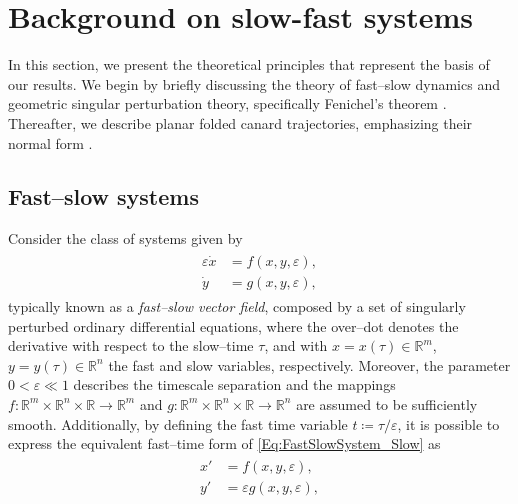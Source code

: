 \documentclass[3p]{elsarticle}
\theoremstyle{plain}
\theoremstyle{remark}
\theoremstyle{definition}
\begin{document}
\appendix
\renewcommand{\thetheorem}{\Alph{section}.\arabic{theorem}}
\renewcommand{\thedefinition}{\Alph{section}.\arabic{definition}}
\renewcommand{\theremark}{\Alph{section}.\arabic{remark}}
\section{Background on slow-fast systems}\label{Sec:Preliminaries}
    In this section, we present the theoretical principles that represent the basis of our results. We begin by briefly discussing the theory of fast--slow dynamics and geometric singular perturbation theory, specifically Fenichel's theorem \cite{Ref:Fenichel1979, Ref:Kuehn2015}. Thereafter, we describe planar folded canard trajectories, emphasizing their normal form \cite{Ref:Krupa2001, Ref:JardonKojakhmetov2022}.
\subsection{Fast--slow systems}
    \label{Sec:FastSlowSystems}
        Consider the class of systems given by
        \begin{align}
            \begin{split}
            \varepsilon \dot{x} &= f(x,y,\varepsilon),\\
            \dot{y} &= g(x,y,\varepsilon),
            \label{Eq:FastSlowSystem_Slow}
            \end{split}
        \end{align}
        typically known as a \emph{fast--slow vector field}, composed by a set of singularly perturbed ordinary differential equations, where the over--dot denotes the derivative with respect to the slow--time $\tau$, and with $x=x(\tau)\in\mathbb{R}^{m}$, $y=y(\tau)\in\mathbb{R}^{n}$ the fast and slow variables, respectively. Moreover, the parameter $0<\varepsilon\ll1$ describes the timescale separation and the mappings $f:\mathbb{R}^{m}\times \mathbb{R}^{n} \times \mathbb{R} \xrightarrow{} \mathbb{R}^{m}$ and $g: \mathbb{R}^{m} \times \mathbb{R}^{n} \times \mathbb{R}\xrightarrow{} \mathbb{R}^{n}$ are assumed to be sufficiently smooth. Additionally, by defining the fast time variable $t\coloneqq \tau/\varepsilon$, it is possible to express the equivalent fast--time form of \eqref{Eq:FastSlowSystem_Slow} as
        \begin{align}
            \begin{split}
                x' &= f(x,y,\varepsilon),\\
                y' &= \varepsilon g(x,y,\varepsilon),
                \label{Eq:FastSlowSystem_Fast}
            \end{split}
        \end{align}
\end{document}
